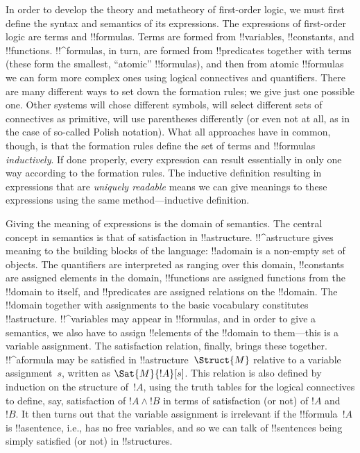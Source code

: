 \documentclass[../../../include/open-logic-section]{subfiles}
\begin{document}


In order to develop the theory and metatheory of first-order logic, we
must first define the syntax and semantics of its expressions.  The
expressions of first-order logic are terms and !!{formula}s.  Terms
are formed from !!{variable}s, !!{constant}s, and !!{function}s.
!!^{formula}s, in turn, are formed from !!{predicate}s together with
terms (these form the smallest, ``atomic'' !!{formula}s), and then
from atomic !!{formula}s we can form more complex ones using logical
connectives and quantifiers.  There are many different ways to set
down the formation rules; we give just one possible one. Other systems
will chose different symbols, will select different sets of
connectives as primitive, will use parentheses differently (or even not
at all, as in the case of so-called Polish notation).  What all
approaches have in common, though, is that the formation rules define
the set of terms and !!{formula}s \emph{inductively}. If done
properly, every expression can result essentially in only one way
according to the formation rules.  The inductive definition resulting
in expressions that are \emph{uniquely readable} means we can give
meanings to these expressions using the same method---inductive
definition.

Giving the meaning of expressions is the domain of semantics.  The
central concept in semantics is that of satisfaction in
!!a{structure}. !!^a{structure} gives meaning to the building blocks
of the language: !!a{domain} is a non-empty set of objects. The
quantifiers are interpreted as ranging over this domain, !!{constant}s
are assigned elements in the domain, !!{function}s are assigned
functions from the !!{domain} to itself, and !!{predicate}s are
assigned relations on the !!{domain}.  The !!{domain} together with
assignments to the basic vocabulary constitutes
!!a{structure}. !!^{variable}s may appear in !!{formula}s, and in
order to give a semantics, we also have to assign !!{element}s of the
!!{domain} to them---this is a variable assignment. The satisfaction
relation, finally, brings these together. !!^a{formula} may be satisfied
in !!a{structure}~$\Struct{M}$ relative to a variable assignment~$s$,
written as $\Sat{M}{!A}[s]$. This relation is also defined by
induction on the structure of~$!A$, using the truth tables for the
logical connectives to define, say, satisfaction of $!A \land !B$ in
terms of satisfaction (or not) of $!A$ and ~$!B$.  It then turns out
that the variable assignment is irrelevant if the !!{formula}~$!A$ is
!!a{sentence}, i.e., has no free variables, and so we can talk of
!!{sentence}s being simply satisfied (or not) in !!{structure}s.
\end{document}
